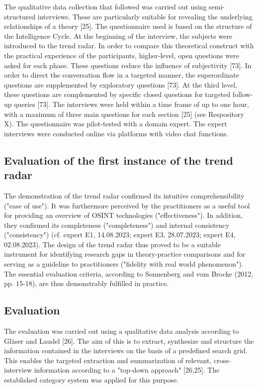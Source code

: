 \documentclass[10pt]{article}
\begin{document}
The qualitative data collection that followed was carried out using
semi-structured interviews. These are particularly suitable for
revealing the underlying relationships of a theory [25]. The
questionnaire used is based on the structure of the Intelligence Cycle.
At the beginning of the interview, the subjects were introduced to the
trend radar. In order to compare this theoretical construct with the
practical experience of the participants, higher-level, open questions
were asked for each phase. These questions reduce the influence of
subjectivity [73]. In order to direct the conversation flow in a
targeted manner, the superordinate questions are supplemented by
exploratory questions [73]. At the third level, these questions are
complemented by specific closed questions for targeted follow-up
queries [73]. The interviews were held within a time frame of up to
one hour, with a maximum of three main questions for each section
 [25] (see Respository X). The questionnaire was pilot-tested with a
domain expert. The expert interviews were conducted online via
platforms with video chat functions.

\subsection{Evaluation of the first instance of the trend radar}

The demonstration of the trend radar confirmed its intuitive
comprehensibility ("ease of use"). It was furthermore perceived by the
practitioners as a useful tool for providing an overview of OSINT
technologies ("effectiveness"). In addition, they confirmed its
completeness ("completeness") and internal consistency ("consistency")
(cf. expert E1, 14.08.2023; expert E3, 28.07.2023; expert E4,
02.08.2023). The design of the trend radar thus proved to be a
suitable instrument for identifying research gaps in theory-practice
comparisons and for serving as a guideline to practitioners
("fidelity with real world phenomenon"). The essential evaluation
criteria, according to Sonnenberg and vom Brocke (2012, pp. 15-18),
are thus demonstrably fulfilled in practice.

\subsection{Evaluation}

The evaluation was carried out using a qualitative data analysis
according to Gläser and Laudel [26]. The aim of this is to extract,
synthesize and structure the information contained in the interviews
on the basis of a predefined search grid. This enables the targeted
extraction and summarization of relevant, cross-interview information
according to a "top-down approach" [26,25]. The established category
system was applied for this purpose.
\end{document}
